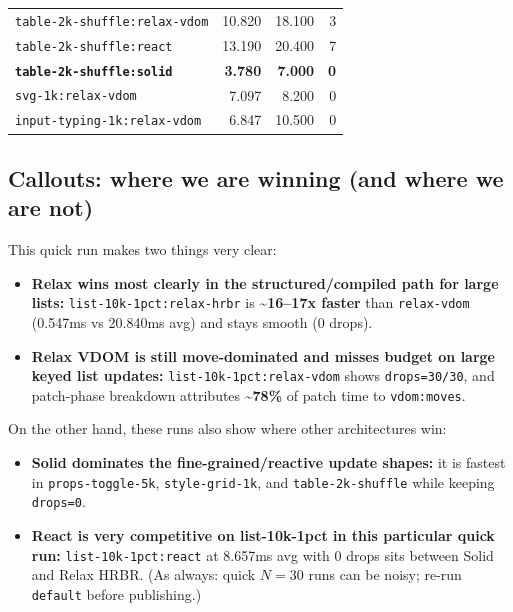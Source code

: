 \begin{center}
\begin{tabular}{lrrr}
			\texttt{table-2k-shuffle:relax-vdom} & 10.820 & 18.100 & 3 \\
			\texttt{table-2k-shuffle:react} & 13.190 & 20.400 & 7 \\
			\textbf{\texttt{table-2k-shuffle:solid}} & \textbf{3.780} & \textbf{7.000} & \textbf{0} \\

			\texttt{svg-1k:relax-vdom} & 7.097 & 8.200 & 0 \\
			\texttt{input-typing-1k:relax-vdom} & 6.847 & 10.500 & 0 \\
\hline
\end{tabular}
\end{center}

\subsection{Callouts: where we are winning (and where we are not)}

This quick run makes two things very clear:

\begin{itemize}
\item \textbf{Relax wins most clearly in the structured/compiled path for large lists:}
		\texttt{list-10k-1pct:relax-hrbr} is \textasciitilde{}\textbf{16--17x faster} than \texttt{relax-vdom} (0.547ms vs 20.840ms avg) and stays smooth (0 drops).
\item \textbf{Relax VDOM is still move-dominated and misses budget on large keyed list updates:}
		\texttt{list-10k-1pct:relax-vdom} shows \texttt{drops=30/30}, and patch-phase breakdown attributes \textasciitilde{}\textbf{78\%} of patch time to \texttt{vdom:moves}.
\end{itemize}

On the other hand, these runs also show where other architectures win:

\begin{itemize}
\item \textbf{Solid dominates the fine-grained/reactive update shapes:}
	it is fastest in \texttt{props-toggle-5k}, \texttt{style-grid-1k}, and \texttt{table-2k-shuffle} while keeping \texttt{drops=0}.
\item \textbf{React is very competitive on list-10k-1pct in this particular quick run:}
		\texttt{list-10k-1pct:react} at 8.657ms avg with 0 drops sits between Solid and Relax HRBR.
	(As always: quick \(N=30\) runs can be noisy; re-run \texttt{default} before publishing.)
\end{itemize}

